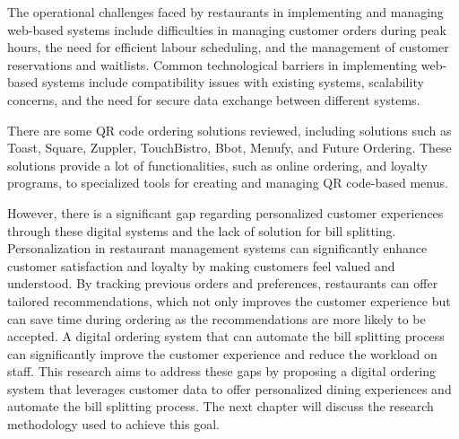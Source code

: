 The operational challenges faced by restaurants in implementing and managing web-based systems include difficulties in managing customer orders during peak hours, the need for efficient labour scheduling, and the management of customer reservations and waitlists. Common technological barriers in implementing web-based systems include compatibility issues with existing systems, scalability concerns, and the need for secure data exchange between different systems.

There are some QR code ordering solutions reviewed, including solutions such as Toast, Square, Zuppler, TouchBistro, Bbot, Menufy, and Future Ordering. These solutions provide a lot of functionalities, such as online ordering, and loyalty programs, to specialized tools for creating and managing QR code-based menus. 

However, there is a significant gap regarding personalized customer experiences through these digital systems and the lack of solution for bill splitting. Personalization in restaurant management systems can significantly enhance customer satisfaction and loyalty by making customers feel valued and understood. By tracking previous orders and preferences, restaurants can offer tailored recommendations, which not only improves the customer experience but can save time during ordering as the recommendations are more likely to be accepted. A digital ordering system that can automate the bill splitting process can significantly improve the customer experience and reduce the workload on staff. This research aims to address these gaps by proposing a digital ordering system that leverages customer data to offer personalized dining experiences and automate the bill splitting process. The next chapter will discuss the research methodology used to achieve this goal.


